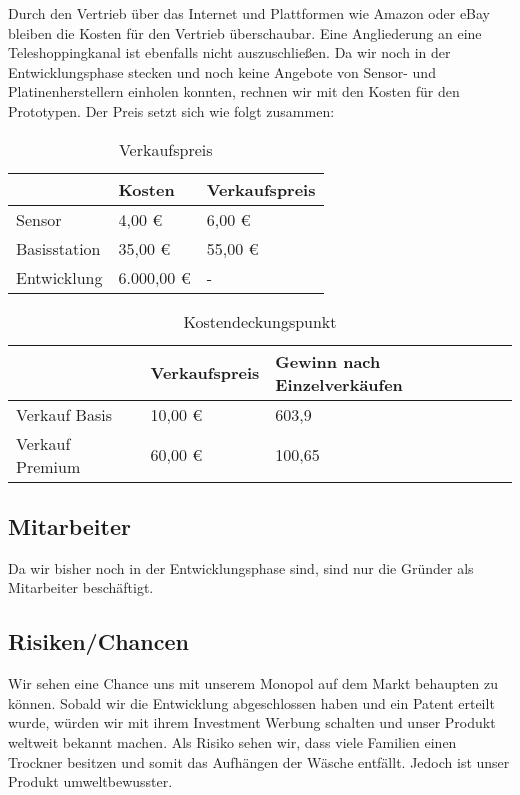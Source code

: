 			Durch den Vertrieb über das Internet und Plattformen wie Amazon oder eBay bleiben die Kosten für den Vertrieb überschaubar. Eine Angliederung an eine Teleshoppingkanal ist ebenfalls nicht auszuschließen. Da wir noch in der Entwicklungsphase stecken und noch keine Angebote von Sensor- und Platinenherstellern einholen konnten, rechnen wir mit den Kosten für den Prototypen. Der Preis setzt sich wie folgt zusammen:
\begin{table}[htbp]
  \centering
  \caption{Verkaufspreis}
    \begin{tabularx}{\textwidth}{|X|XX|}
    \toprule
    & Kosten & Verkaufspreis\\
    \midrule
    Sensor & 4,00 € & 6,00 € \\
    Basisstation & 35,00 € & 55,00 € \\
    Entwicklung & 6.000,00 € & - \\
    \bottomrule
    \end{tabularx}%
  \label{tab:addlabel}%
\end{table}%

\begin{table}[htbp]
	\centering
	\caption{Kostendeckungspunkt}
	\begin{tabularx}{\textwidth}{|X|XX|}
		\toprule
		& Verkaufspreis & Gewinn nach Einzelverkäufen \\
		\midrule
		Verkauf Basis & 10,00 € & 603,9 \\
		 Verkauf Premium & 60,00 € & 100,65 \\
		\bottomrule
	\end{tabularx}%
	\label{tab:addlabel}%
\end{table}%

\subsection{Mitarbeiter}
	Da wir bisher noch in der Entwicklungsphase sind, sind nur die Gründer als Mitarbeiter beschäftigt. 
			
\subsection{Risiken/Chancen}
	Wir sehen eine Chance uns mit unserem Monopol auf dem Markt behaupten zu können. 
	Sobald wir die Entwicklung abgeschlossen haben und ein Patent erteilt wurde, würden wir mit ihrem Investment Werbung schalten und unser Produkt weltweit bekannt machen. Als Risiko sehen wir, dass viele Familien einen Trockner besitzen und somit das Aufhängen der Wäsche entfällt. Jedoch ist unser Produkt umweltbewusster.




